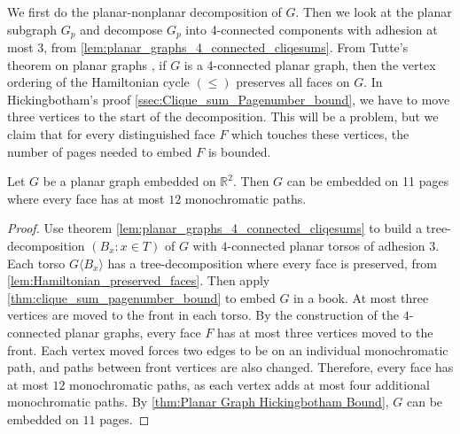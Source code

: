 We first do the planar-nonplanar decomposition of \(G\).
Then we look at the planar subgraph \(G_p\) and decompose \(G_p\) into 4-connected components with adhesion at most 3, from \cref{lem:planar_graphs_4_connected_cliqesums}.
From Tutte's theorem on planar graphs \cite{tutteTheoremPlanarGraphs1956}, if \(G\) is a 4-connected planar graph, then the vertex ordering of the Hamiltonian cycle \((\leq)\) preserves all faces on \(G\).
In Hickingbotham's proof \cref{ssec:Clique_sum_Pagenumber_bound}, we have to move three vertices to the start of the decomposition. This will be a problem, but we claim that for every distinguished face \(F\) which touches these vertices, the number of pages needed to embed \(F\) is bounded.


\begin{theorem}\label{thm:embedded_graph}
	Let \( G \) be a planar graph embedded on $\mathbb{R}^2$. Then $G$ can be embedded on 11 pages where every face has at most $12$ monochromatic paths. 
\end{theorem}

\begin{proof}
	Use theorem \cref{lem:planar_graphs_4_connected_cliqesums} to build a tree-decomposition $(B_x : x \in T)$ of $G$ with $4$-connected planar torsos of adhesion 3. Each torso $G \langle B_x \rangle$ has a tree-decomposition where every face is preserved, from \cref{lem:Hamiltonian_preserved_faces}. Then apply \cref{thm:clique_sum_pagenumber_bound} to embed $G$ in a book. At most three vertices are moved to the front in each torso. By the construction of the $4$-connected planar graphs, every face $F$ has at most three vertices moved to the front. Each vertex moved forces two edges to be on an individual monochromatic path, and paths between front vertices are also changed. Therefore, every face has at most $12$ monochromatic paths, as each vertex adds at most four additional monochromatic paths. By \cref{thm:Planar Graph Hickingbotham Bound}, $G$ can be embedded on $11$ pages.
\end{proof}